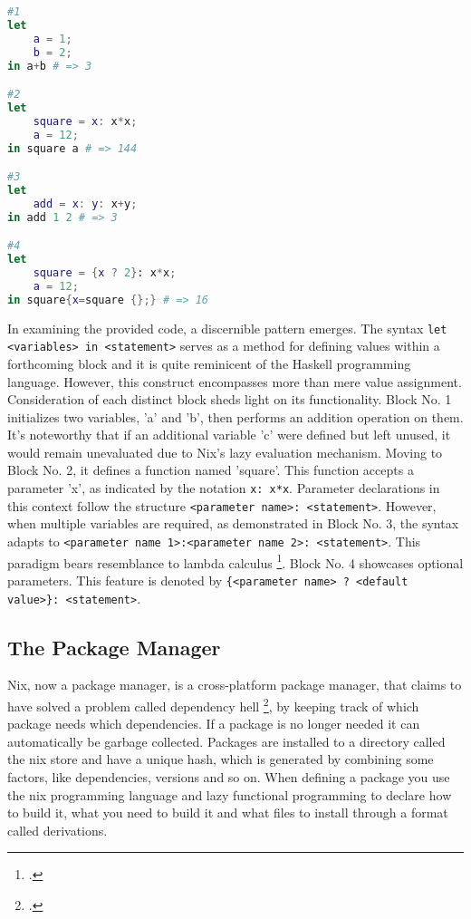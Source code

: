 \begin{minipage}{\textwidth}
\begin{lstlisting}[language=Nix, caption={Simple Examples of the Nix Language}]
#1
let
    a = 1;
    b = 2;
in a+b # => 3

#2
let
    square = x: x*x;
    a = 12;
in square a # => 144

#3
let 
    add = x: y: x+y;
in add 1 2 # => 3

#4
let
    square = {x ? 2}: x*x;
    a = 12;
in square{x=square {};} # => 16
\end{lstlisting}
\end{minipage}


In examining the provided code, a discernible pattern emerges. The syntax \newline \verb+let <variables> in <statement>+ serves as a method for defining values within a forthcoming block and it is quite reminicent of the Haskell programming language. However, this construct encompasses more than mere value assignment.
Consideration of each distinct block sheds light on its functionality. Block No. 1 initializes two variables, 'a' and 'b', then performs an addition operation on them. It's noteworthy that if an additional variable 'c' were defined but left unused, it would remain unevaluated due to Nix's lazy evaluation mechanism.
Moving to Block No. 2, it defines a function named 'square'. This function accepts a parameter 'x', as indicated by the notation \verb+x: x*x+. Parameter declarations in this context follow the structure \verb+<parameter name>: <statement>+. However, when multiple variables are required, as demonstrated in Block No. 3, the syntax adapts to \verb+<parameter name 1>:<parameter name 2>: <statement>+. This paradigm bears resemblance to lambda calculus \footcite{lambda_calculus}.
Block No. 4 showcases optional parameters. This feature is denoted by \newline \verb+{<parameter name> ? <default value>}: <statement>+.


\subsection{The Package Manager}
Nix, now a package manager, is a cross-platform package manager, that claims to have solved a problem called dependency hell \footcite{dependency_hell}, by keeping track of which package needs which dependencies. If a package is no longer needed it can automatically be garbage collected. Packages are installed to a directory called the nix store and have a unique hash, which is generated by combining some factors, like dependencies, versions and so on.
When defining a package you use the nix programming language and lazy functional programming to declare how to build it, what you need to build it and what files to install through a format called derivations.

